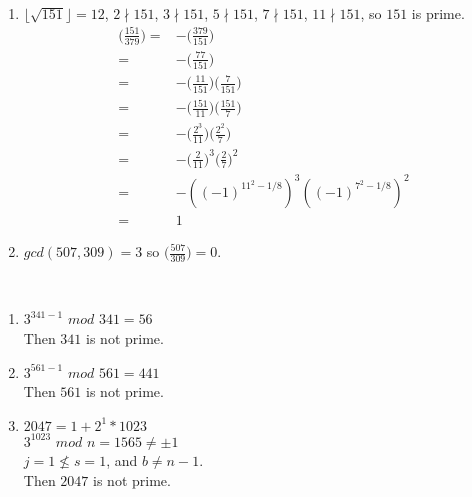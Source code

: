 \documentclass{assignment}
\begin{document}
\begin{problemlist}
\pbitem
\begin{problem}
\end{problem}
\begin{answer}
  \\
  \begin{enumerate}
  \item
    $\lfloor \sqrt{151} \rfloor = 12$, $2\nmid 151$, $3\nmid 151$, $5\nmid 151$, $7\nmid 151$, $11\nmid 151$, so $151$ is prime.\\
    \begin{align*}
      \Big(\frac{151}{379}\Big)=&-\Big(\frac{379}{151}\Big)\\
      =&-\Big(\frac{77}{151}\Big)\\
      =&-\Big(\frac{11}{151}\Big)\Big(\frac{7}{151}\Big)\\
      =&-\Big(\frac{151}{11}\Big)\Big(\frac{151}{7}\Big)\\
      =&-\Big(\frac{2^3}{11}\Big)\Big(\frac{2^2}{7}\Big)\\
      =&-\Big(\frac{2}{11}\Big)^3\Big(\frac{2}{7}\Big)^2\\
      =&-((-1)^{11^2-1/8})^3((-1)^{7^2-1/8})^2\\
      =&1
    \end{align*}
  \item
    $gcd(507,309)=3$ so $\Big(\frac{507}{309}\Big)=0$.\\
  \end{enumerate}
\end{answer}

\pbitem
\begin{problem}
\end{problem}
\begin{answer}
  \\
  \begin{enumerate}
  \item
    $3^{341-1}$ $mod$ $341 = 56$\\
    Then $341$ is not prime.
  \item
    $3^{561-1}$ $mod$ $561 = 441$\\
    Then $561$ is not prime.
  \item
    $2047=1+2^1*1023$\\
    $3^{1023}$ $mod$ $n=1565 \neq \pm1$\\
    $j=1\not \le s=1$, and $b \neq n-1$.\\
    Then $2047$ is not prime.\\
  \end{enumerate}
\end{answer}

\end{problemlist}
\end{document}
